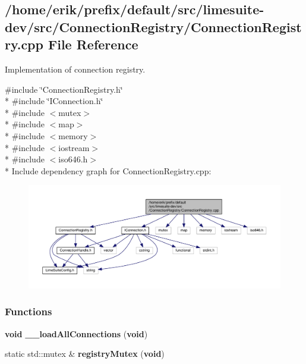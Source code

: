 \subsection{/home/erik/prefix/default/src/limesuite-\/dev/src/\+Connection\+Registry/\+Connection\+Registry.cpp File Reference}
\label{ConnectionRegistry_8cpp}


Implementation of connection registry.  


{\ttfamily \#include \char`\"{}Connection\+Registry.\+h\char`\"{}}\\*
{\ttfamily \#include \char`\"{}I\+Connection.\+h\char`\"{}}\\*
{\ttfamily \#include $<$mutex$>$}\\*
{\ttfamily \#include $<$map$>$}\\*
{\ttfamily \#include $<$memory$>$}\\*
{\ttfamily \#include $<$iostream$>$}\\*
{\ttfamily \#include $<$iso646.\+h$>$}\\*
Include dependency graph for Connection\+Registry.\+cpp\+:
\nopagebreak
\begin{figure}[H]
\begin{center}
\leavevmode
\includegraphics[width=350pt]{da/d5f/ConnectionRegistry_8cpp__incl}
\end{center}
\end{figure}
\subsubsection*{Functions}
\begin{DoxyCompactItemize}
\item 
{\bf void} {\bf \+\_\+\+\_\+load\+All\+Connections} ({\bf void})
\item 
static std\+::mutex \& {\bf registry\+Mutex} ({\bf void})
\end{DoxyCompactItemize}
